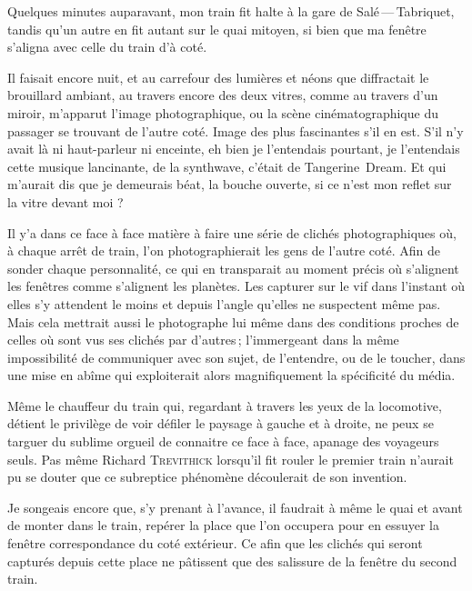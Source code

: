 \begin{prose}
  Quelques minutes auparavant, mon train fit halte à la gare de Salé\,—\,Tabriquet, tandis qu’un autre en fit autant sur le quai mitoyen, si bien que ma fenêtre s’aligna avec celle du train d’à coté.

  Il faisait encore nuit, et au carrefour des lumières et néons que diffractait le brouillard ambiant, au travers encore des deux vitres, comme au travers d’un miroir, m’apparut l’image photographique, ou la scène cinématographique  du passager se trouvant de l’autre coté. Image des plus fascinantes s’il en est. S’il n’y avait là ni haut-parleur ni enceinte, eh bien je l’entendais pourtant, je l’entendais cette musique lancinante, de la synthwave, c’était  de Tangerine~Dream. Et qui m’aurait dis que je demeurais béat, la bouche ouverte, si ce n’est mon reflet sur la vitre devant moi ?


  Il y’a dans ce face à face matière à faire une série de clichés photographiques où, à chaque arrêt de train, l’on photographierait les gens de l’autre coté.
Afin de  sonder chaque personnalité, ce qui en transparait au moment précis où s’alignent les fenêtres comme s’alignent les planètes. Les capturer sur le vif dans l’instant où elles s’y attendent le moins et depuis l’angle qu’elles ne suspectent même pas. Mais cela mettrait aussi le photographe lui même dans des conditions proches de celles où sont vus ses clichés par d’autres\,; l’immergeant dans la même impossibilité de communiquer avec son sujet, de l’entendre, ou de le toucher, dans une mise en abîme qui exploiterait alors magnifiquement la spécificité du média.

  Même le chauffeur du train qui, regardant à travers les yeux de la locomotive, détient le privilège de voir défiler le paysage à gauche et à droite, ne peux se targuer du sublime orgueil de connaitre ce face à face, apanage des voyageurs seuls. Pas même Richard \textsc{Trevithick} lorsqu’il fit rouler le premier train n’aurait pu se douter que ce subreptice phénomène découlerait de son invention.

Je songeais encore que, s’y prenant à l’avance, il faudrait à même le quai et avant de monter dans le train, repérer la place que l’on occupera pour en essuyer la fenêtre correspondance du coté extérieur. Ce afin que les clichés qui seront capturés depuis cette place ne pâtissent que des salissure de la fenêtre du second train.



\end{prose}
